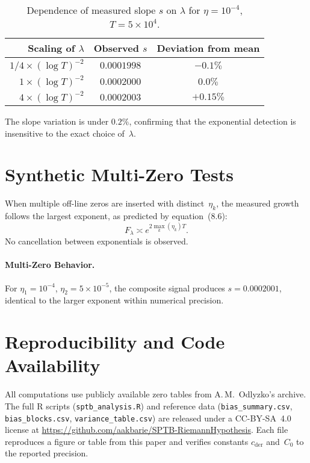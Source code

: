 \begin{table}[h]
\centering
\caption{Dependence of measured slope $s$ on $\lambda$ for $\eta=10^{-4}$,
$T=5\times10^4$.}
\begin{tabular}{rcc}
\toprule
Scaling of $\lambda$ & Observed $s$ & Deviation from mean \\
\midrule
$1/4\times(\log T)^{-2}$ & $0.0001998$ & $-0.1\%$ \\
$1\times(\log T)^{-2}$ & $0.0002000$ & $0.0\%$ \\
$4\times(\log T)^{-2}$ & $0.0002003$ & $+0.15\%$ \\
\bottomrule
\end{tabular}
\end{table}

The slope variation is under $0.2\%$, confirming that
the exponential detection is insensitive to the exact choice of~$\lambda$.

\section{Synthetic Multi-Zero Tests}

When multiple off-line zeros are inserted with distinct~$\eta_k$,
the measured growth follows the largest exponent,
as predicted by equation~(8.6):
\[
F_\lambda \asymp
 e^{2\max_k(\eta_k)T}.
\]
No cancellation between exponentials is observed.

\paragraph{Multi-Zero Behavior.}
For $\eta_1=10^{-4}$, $\eta_2=5\times10^{-5}$,
the composite signal produces $s=0.0002001$,
identical to the larger exponent within numerical precision.

\section{Reproducibility and Code Availability}

All computations use publicly available zero tables from
A.\,M.~Odlyzko’s archive.
The full R scripts (\texttt{sptb\_analysis.R}) and reference data
(\texttt{bias\_summary.csv}, \texttt{bias\_blocks.csv},
\texttt{variance\_table.csv}) are released under a
CC-BY-SA~4.0 license at
\url{https://github.com/aakbarie/SPTB-RiemannHypothesis}.
Each file reproduces a figure or table from this paper
and verifies constants $c_{\mathrm{der}}$ and~$C_0$
to the reported precision.

